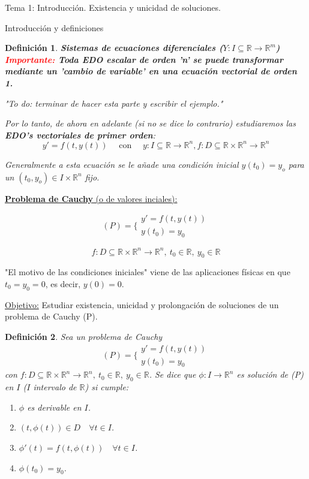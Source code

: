\documentclass{article}
\newcommand{\cauchy}[0]{
    \[(P) = \biggl\{ 
            \begin{array}{c}
            y' = f(t,y(t)) \\
            y(t_0) = y_0
            \end{array}
    \]
}
\newcommand{\defcauchy}{f: D \subseteq \mathbb{R}\times \mathbb{R}^n \rightarrow\mathbb{R}^n, \ t_0\in \mathbb{R}, \ y_0\in \mathbb{R}}
\newtheorem{definition}{Definición}[section]
\begin{document}
\begin{section}{Tema 1: Introducción. Existencia y unicidad de soluciones.}
\begin{subsection}{Introducción y definiciones}
\begin{definition}{\textbf{Sistemas de ecuaciones diferenciales ($Y: I\subseteq \mathbb{R} \rightarrow \mathbb{R}^m$)}}
            \textbf{\textcolor{red}{Importante:} Toda EDO escalar de orden 'n' se puede transformar mediante un 'cambio de variable' en una ecuación vectorial de orden 1.}

            "To do: terminar de hacer esta parte y escribir el ejemplo."

            Por lo tanto, de ahora en adelante (si no se dice lo contrario) estudiaremos las \textbf{EDO's vectoriales de primer orden}:
            \[y' =f(t,y(t))\quad \text{ con }\quad y: I \subseteq \mathbb{R} \rightarrow \mathbb{R}^n, f:D \subseteq \mathbb{R} \times \mathbb{R}^n \rightarrow \mathbb{R}^n\]

            Generalmente a esta ecuación se le añade una condición inicial $y(t_0) = y_o$ para un $(t_0,y_o)\in I\times \mathbb{R}^n$ fijo.
        \end{definition}
	\end{subsection}

    \begin{subsection}{\underline{\textbf{Problema de Cauchy} (o de valores inciales):}}

        \cauchy

        \[f: D \subseteq \mathbb{R}\times \mathbb{R}^n \rightarrow\mathbb{R}^n, \ t_0\in \mathbb{R}, \ y_0\in \mathbb{R}\]
        
        "El motivo de las condiciones iniciales" viene de las aplicaciones físicas en que $t_0=y_0=0$, es decir, $y(0)=0$.

        \underline{Objetivo:} Estudiar existencia, unicidad y prolongación de soluciones de un problema de Cauchy (P).

        \begin{definition}
            Sea un problema de Cauchy \cauchy con $\defcauchy$. Se dice que $\phi: I \rightarrow \mathbb{R}^n$ es solución de (P) en $I$ ($I$ intervalo de $\mathbb{R}$)
            si cumple:

            \begin{enumerate}
                \item $\phi$ es derivable en $I$.
                \item $(t, \phi(t))\in D \quad\forall t\in I$.
                \item $\phi'(t) = f(t, \phi(t))\quad\forall t\in I$.
                \item $\phi(t_0) = y_0$.
            \end{enumerate}
        \end{definition}


\end{subsection}
\end{section}
\end{document}
